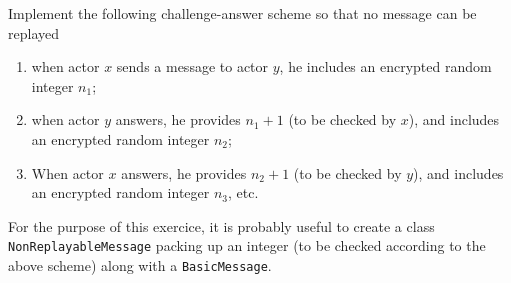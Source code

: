 \documentclass[a4paper,11pt]{article}
\begin{document}
\begin{exo}
  Implement the following challenge-answer scheme so that no message can be replayed%
\begin{enumerate}
\item when actor $x$ sends a message to actor $y$, he includes an encrypted random integer $n_1$;
\item when actor $y$ answers, he provides $n_1+1$ (to be checked by $x$), and includes an encrypted random integer $n_2$;
\item When actor $x$ answers, he provides $n_2+1$ (to be checked by $y$), and includes an encrypted random integer $n_3$, etc.\\
\end{enumerate}

For the purpose of this exercice, it is probably useful to create a class \texttt{NonReplayableMessage} packing up an integer (to be checked according to the above scheme) along with a \texttt{BasicMessage}.
\end{exo}
\end{document}
